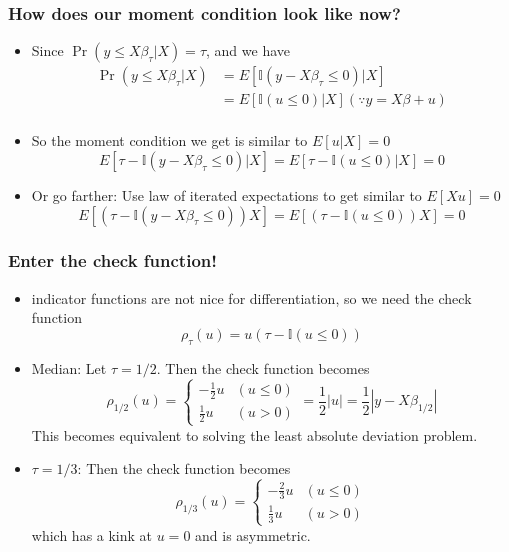 \documentclass[aspectratio=169]{beamer}
\begin{document}
\begin{frame}
\frametitle{How does our moment condition look like now?}
\begin{itemize}
\item Since $\Pr(y\leq X\beta_\tau|X)=\tau$, and we have 
\[
\begin{aligned}
\Pr(y\leq X\beta_\tau|X)&=E[\mathbb{I}(y-X\beta_\tau\leq0)|X]\\
&=E[\mathbb{I}(u\leq0)|X] (\because y=X\beta+u)\\
\end{aligned}
\]
\item So the moment condition we get is similar to $E[u|X]=0$
\[
E[\tau-\mathbb{I}(y- X\beta_\tau\leq 0)|X]=E[\tau-\mathbb{I}(u\leq 0)|X]=0
\]
\item Or go farther: Use law of iterated expectations to get similar to $E[Xu]=0$
\[
E[(\tau-\mathbb{I}(y- X\beta_\tau\leq 0))X]=E[(\tau-\mathbb{I}(u\leq 0))X]=0
\]
\end{itemize}
\end{frame}

\begin{frame}
\frametitle{Enter the check function!}
\begin{itemize}
\item  indicator functions are not nice for differentiation, so we need the check function
\[
\rho_\tau(u)=u(\tau-\mathbb{I}(u\leq0))
\]

\item Median: Let $\tau=1/2$. Then the check function becomes
\[
\rho_{1/2}(u)=\begin{cases}-\frac{1}{2}u & (u\leq 0) \\ \frac{1}{2}u & (u>0) \end{cases} = \frac{1}{2}|u|=\frac{1}{2}|y-X\beta_{1/2}|
\]
This becomes equivalent to solving the least absolute deviation problem.
\item $\tau=1/3$: Then the check function becomes
\[
\rho_{1/3}(u)=\begin{cases}-\frac{2}{3}u & (u\leq 0) \\ \frac{1}{3}u & (u>0) \end{cases}
\]
which has a kink at $u=0$ and is asymmetric.
\end{itemize}
\end{frame}
\end{document}
